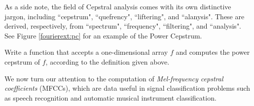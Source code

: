 As a side note, the field of Cepstral analysis comes with its own distinctive jargon, including ``cepstrum",
``quefrency", ``liftering", and ``alanysis". These are derived, respectively, from ``spectrum",
``frequency", ``filtering", and ``analysis". See Figure \ref{fourierext:pc} for an example of the Power 
Cepstrum.

\begin{problem}
Write a function  that accepts a one-dimensional array $f$ and computes the
power cepstrum of $f$, according to the definition given above.
\end{problem}

We now turn our attention to the computation of \emph{Mel-frequency cepstral coefficients} (MFCCs), which
are data useful in signal classification problems such as
speech recognition and automatic musical instrument classification.

